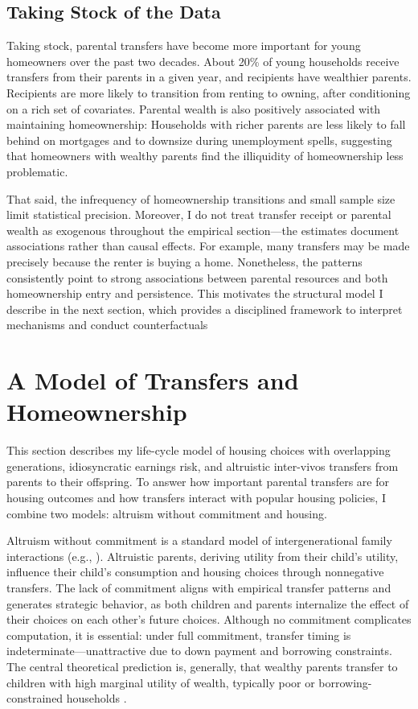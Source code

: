 \documentclass[12pt]{article}
\begin{document}
\subsection{Taking Stock of the Data}
Taking stock, parental transfers have become more important for young homeowners over the past two decades. About 20\% of young households receive transfers from their parents in a given year, and recipients have wealthier parents. Recipients are more likely to transition from renting to owning, after conditioning on a rich set of covariates. Parental wealth is also positively associated with maintaining homeownership: Households with richer parents are less likely to fall behind on mortgages and to downsize during unemployment spells, suggesting that homeowners with wealthy parents find the illiquidity of homeownership less problematic.

That said, the infrequency of homeownership transitions and small sample size limit statistical precision. Moreover, I do not treat transfer receipt or parental wealth as exogenous throughout the empirical section---the estimates document associations rather than causal effects. For example, many transfers may be made precisely because the renter is buying a home. Nonetheless, the patterns consistently point to strong associations between parental resources and both homeownership entry and persistence. This motivates the structural model I describe in the next section, which provides a disciplined framework to interpret mechanisms and conduct counterfactuals

\section{A Model of Transfers and Homeownership}\label{sec:model}
This section describes my life-cycle model of housing choices with overlapping generations, idiosyncratic earnings risk, and altruistic inter-vivos transfers from parents to their offspring. To answer how important parental transfers are for housing outcomes and how transfers interact with popular housing policies, I combine two models: altruism without commitment and housing.

Altruism without commitment is a standard model of intergenerational family interactions (e.g., \cite{Altonji1997a,Barczyk2018}). Altruistic parents, deriving utility from their child's utility, influence their child's consumption and housing choices through nonnegative transfers. The lack of commitment aligns with empirical transfer patterns and generates strategic behavior, as both children and parents internalize the effect of their choices on each other's future choices. Although no commitment complicates computation, it is essential: under full commitment, transfer timing is indeterminate---unattractive due to down payment and borrowing constraints. The central theoretical prediction is, generally, that wealthy parents transfer to children with high marginal utility of wealth, typically poor or borrowing-constrained households \citep{Chu2020,Barczyk2020}.
\end{document}
